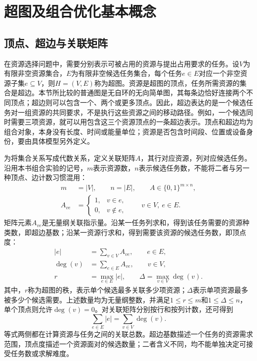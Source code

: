\section{超图及组合优化基本概念}
\label{sec:01_02}

\subsection{顶点、超边与关联矩阵}

在资源选择问题中，需要分别表示可被占用的资源与提出占用要求的任务。设$V$为有限非空资源集合，$E$为有限非空候选任务集合，每个任务$e\in E$对应一个非空资源子集$e\subseteq V$，则$H=(V,E)$称为超图。资源是超图的顶点，任务所需资源的集合是超边。本节所比较的普通图是无自环的无向简单图，其每条边恰好连接两个不同顶点；超边则可以包含一个、两个或更多顶点。因此，超边表达的是一个候选任务对一组资源的共同要求，不是执行这些资源之间的移动路径。例如，一个候选同时需要三项资源，就可以用包含这三个资源顶点的一条超边表示。顶点和超边均为组合对象，本身没有长度、时间或能量单位；资源是否包含时间段、位置或设备身份，要由具体模型另外定义。

为将集合关系写成代数关系，定义关联矩阵$A$，其行对应资源，列对应候选任务。沿用本书组合实验的记号，$m$表示资源数，$n$表示候选任务数，不能将二者与另一种顶点、边计数习惯混用：
\begin{align}
 m&=|V|,\qquad n=|E|,\qquad A\in\{0,1\}^{m\times n},
 \label{s0102:matrix_size}\\
 A_{ve}&=
 \begin{cases}
 1, & v\in e,\\
 0, & v\notin e,
 \end{cases}
 \qquad v\in V,\ e\in E.
 \label{s0102:incidence}
\end{align}
矩阵元素$A_{ve}$是无量纲关联指示量。沿某一任务列求和，得到该任务需要的资源种类数，即超边基数；沿某一资源行求和，得到需要该资源的候选任务数，即顶点度：
\begin{align}
 |e|&=\sum_{v\in V}A_{ve},\qquad e\in E,\\
 \deg(v)&=\sum_{e\in E}A_{ve},\qquad v\in V,\\
 r&=\max_{e\in E}|e|,\qquad
 \Delta=\max_{v\in V}\deg(v).
 \label{s0102:rank_degree}
\end{align}
其中，$r$称为超图的秩，表示单个候选最多关联多少项资源；$\Delta$表示单项资源最多被多少个候选需要。上述数量均为无量纲整数，并满足$1\leq r\leq m$和$1\leq\Delta\leq n$，单个顶点则允许$\deg(v)=0$。对关联矩阵分别按行和按列计数，还可得到
\begin{equation}
 \sum_{e\in E}|e|=\sum_{v\in V}\deg(v).
 \label{s0102:incidence_count}
\end{equation}
等式两侧都在计算资源与任务之间的关联总数。超边基数描述一个任务的资源需求范围，顶点度描述一个资源面对的候选数量；二者含义不同，均不能单独决定可接受任务数或求解难度。

